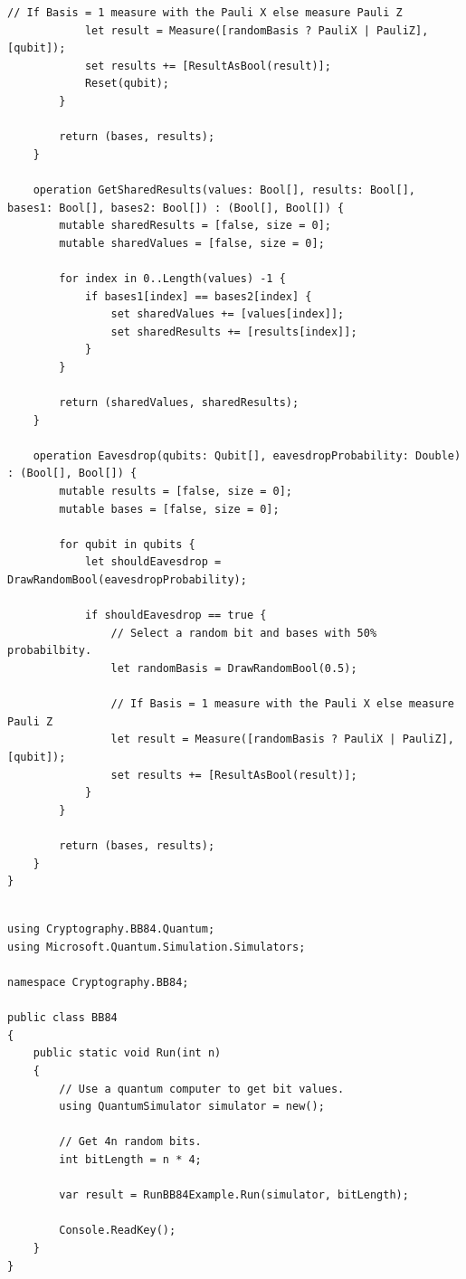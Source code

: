 \documentclass{article}
\begin{document}
\begin{lstlisting}[language={[Sharp]C}, caption={Q\# Microsoft Quantum Development Kit}, label={Script}]
            // If Basis = 1 measure with the Pauli X else measure Pauli Z
            let result = Measure([randomBasis ? PauliX | PauliZ], [qubit]);
            set results += [ResultAsBool(result)];
            Reset(qubit);
        }

        return (bases, results);
    }

    operation GetSharedResults(values: Bool[], results: Bool[], bases1: Bool[], bases2: Bool[]) : (Bool[], Bool[]) {
        mutable sharedResults = [false, size = 0];
        mutable sharedValues = [false, size = 0];

        for index in 0..Length(values) -1 {
            if bases1[index] == bases2[index] {
                set sharedValues += [values[index]];
                set sharedResults += [results[index]];
            }
        }

        return (sharedValues, sharedResults);
    }

    operation Eavesdrop(qubits: Qubit[], eavesdropProbability: Double) : (Bool[], Bool[]) {
        mutable results = [false, size = 0];
        mutable bases = [false, size = 0];

        for qubit in qubits {
            let shouldEavesdrop = DrawRandomBool(eavesdropProbability);

            if shouldEavesdrop == true {
                // Select a random bit and bases with 50% probabilbity.
                let randomBasis = DrawRandomBool(0.5);

                // If Basis = 1 measure with the Pauli X else measure Pauli Z
                let result = Measure([randomBasis ? PauliX | PauliZ], [qubit]);
                set results += [ResultAsBool(result)];
            }
		}

        return (bases, results);
    }
}

\end{lstlisting}

\begin{lstlisting}[language={[Sharp]C}, caption={C\# Driver code sets the number of qubits to 4n}, label={Script}]

using Cryptography.BB84.Quantum;
using Microsoft.Quantum.Simulation.Simulators;

namespace Cryptography.BB84;

public class BB84
{
    public static void Run(int n)
    {
        // Use a quantum computer to get bit values.
        using QuantumSimulator simulator = new();

        // Get 4n random bits.
        int bitLength = n * 4;

        var result = RunBB84Example.Run(simulator, bitLength);

        Console.ReadKey();
    }
}

\end{lstlisting}
\end{document}
